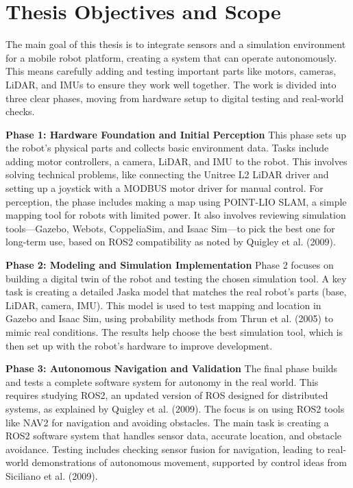 \section{Thesis Objectives and Scope}

The main goal of this thesis is to integrate sensors and a simulation environment
for a mobile robot platform, creating a system that can operate autonomously.
This means carefully adding and testing important parts like motors, cameras,
LiDAR, and IMUs to ensure they work well together. The work is divided into
three clear phases, moving from hardware setup to digital testing and real-world checks.

\textbf{Phase 1: Hardware Foundation and Initial Perception}
This phase sets up the robot's physical parts and collects basic environment data.
Tasks include adding motor controllers, a camera, LiDAR, and IMU to the robot.
This involves solving technical problems, like connecting the Unitree L2 LiDAR driver
and setting up a joystick with a MODBUS motor driver for manual control. For perception,
the phase includes making a map using POINT-LIO SLAM, a simple mapping tool for robots
with limited power. It also involves reviewing simulation tools—Gazebo, Webots,
CoppeliaSim, and Isaac Sim—to pick the best one for long-term use, based on ROS2
compatibility as noted by Quigley et al. (2009).

\textbf{Phase 2: Modeling and Simulation Implementation}
Phase 2 focuses on building a digital twin of the robot and testing the chosen
simulation tool. A key task is creating a detailed Jaska model that matches the
real robot's parts (base, LiDAR, camera, IMU). This model is used to test mapping
and location in Gazebo and Isaac Sim, using probability methods from Thrun et al. (2005)
to mimic real conditions. The results help choose the best simulation tool, which
is then set up with the robot's hardware to improve development.

\textbf{Phase 3: Autonomous Navigation and Validation}
The final phase builds and tests a complete software system for autonomy in the
real world. This requires studying ROS2, an updated version of ROS designed for
distributed systems, as explained by Quigley et al. (2009). The focus is on using
ROS2 tools like NAV2 for navigation and avoiding obstacles. The main task is creating
a ROS2 software system that handles sensor data, accurate location, and obstacle
avoidance. Testing includes checking sensor fusion for navigation, leading to
real-world demonstrations of autonomous movement, supported by control ideas from
Siciliano et al. (2009).

